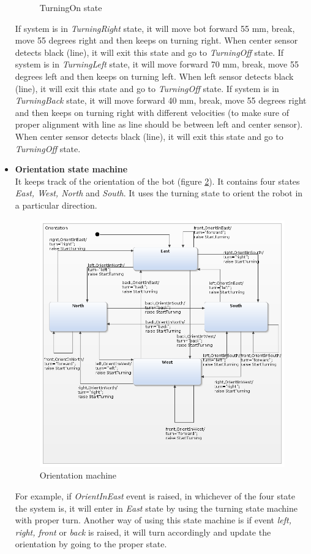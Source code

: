 \documentclass[a4paper,12pt,oneside]{book}
\begin{document}
\begin{itemize}
\begin{figure}[!htbp]
	\caption{TurningOn state}
	\label{turning_on}
\end{figure}
If system is in \textit{TurningRight} state, it will move bot forward 55 mm, break, move 55 degrees right and then keeps on turning right. When center sensor detects black (line), it will exit this state and go to \textit{TurningOff} state.
If system is in \textit{TurningLeft} state, it will move forward 70 mm, break, move 55 degrees left and then keeps on turning left. When left sensor detects black (line), it will exit this state and go to \textit{TurningOff} state.
If system is in \textit{TurningBack} state, it will move forward 40 mm, break, move 55 degrees right and then keeps on turning right with different velocities (to make sure of proper alignment with line as line should be between left and center sensor). When center sensor detects black (line), it will exit this state and go to \textit{TurningOff} state.

\item \textbf{Orientation state machine}\\
It keeps track of the orientation of the bot (figure \ref{orientation}). It contains four states \textit{East, West, North} and \textit{South}. It uses the turning state to orient the robot in a particular direction. 
\begin{figure}[h]
	\centering
	\includegraphics[scale=.6]{orientation.png}
	\caption{Orientation machine}
	\label{orientation}
\end{figure}
For example, if \textit{OrientInEast} event is raised, in whichever of the four state the system is, it will enter in \textit{East} state by using the turning state machine with proper turn. Another way of using this state machine is if event \textit{left, right, front} or \textit{back} is raised, it will turn accordingly and update the orientation by going to the proper state.


\end{itemize}
\end{document}
